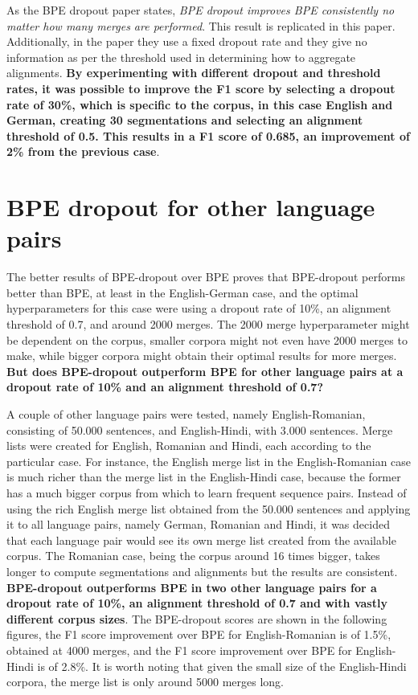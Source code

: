 As the BPE dropout paper states, \emph{BPE dropout improves BPE consistently no matter how many merges are performed}. This result is replicated in this paper. Additionally, in the paper they use a fixed dropout rate and they give no information as per the threshold used in determining how to aggregate alignments. \textbf{By experimenting with different dropout and threshold rates, it was possible to improve the F1 score by selecting a dropout rate of 30\%, which is specific to the corpus, in this case English and German, creating 30 segmentations and selecting an alignment threshold of 0.5. This results in a F1 score of 0.685, an improvement of 2\% from the previous case}.

\section{BPE dropout for other language pairs}

The better results of BPE-dropout over BPE proves that BPE-dropout performs better than BPE, at least in the English-German case, and the optimal hyperparameters for this case were using a dropout rate of 10\%, an alignment threshold of 0.7, and around 2000 merges. The 2000 merge hyperparameter might be dependent on the corpus, smaller corpora might not even have 2000 merges to make, while bigger corpora might obtain their optimal results for more merges. \textbf{But does BPE-dropout outperform BPE for other language pairs at a dropout rate of 10\% and an alignment threshold of 0.7?}

A couple of other language pairs were tested, namely English-Romanian, consisting of 50.000 sentences, and English-Hindi, with 3.000 sentences. Merge lists were created for English, Romanian and Hindi, each according to the particular case. For instance, the English merge list in the English-Romanian case is much richer than the merge list in the English-Hindi case, because the former has a much bigger corpus from which to learn frequent sequence pairs. Instead of using the rich English merge list obtained from the 50.000 sentences and applying it to all language pairs, namely German, Romanian and Hindi, it was decided that each language pair would see its own merge list created from the available corpus. The Romanian case, being the corpus around 16 times bigger, takes longer to compute segmentations and alignments but the results are consistent. \textbf{BPE-dropout outperforms BPE in two other language pairs for a dropout rate of 10\%, an alignment threshold of 0.7 and with vastly different corpus sizes}. The BPE-dropout scores are shown in the following figures, the F1 score improvement over BPE for English-Romanian is of 1.5\%, obtained at 4000 merges, and the F1 score improvement over BPE for English-Hindi is of 2.8\%. It is worth noting that given the small size of the English-Hindi corpora, the merge list is only around 5000 merges long.

